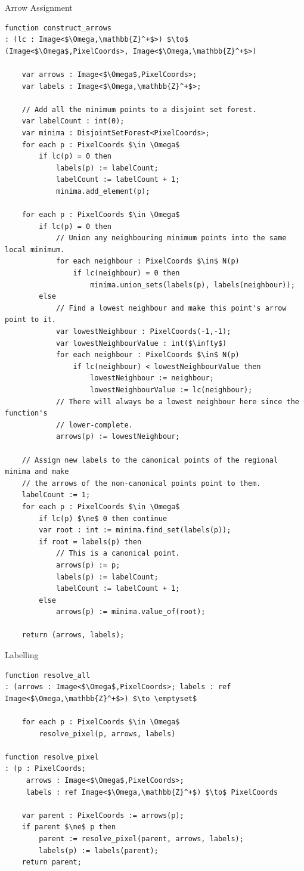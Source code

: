 \begin{stulisting}[p]
\caption{Arrow Assignment}
\label{code:segmentation-watershed-arrowassignment}
\begin{lstlisting}[style=Default]
function construct_arrows
: (lc : Image<$\Omega,\mathbb{Z}^+$>) $\to$ (Image<$\Omega$,PixelCoords>, Image<$\Omega,\mathbb{Z}^+$>)

	var arrows : Image<$\Omega$,PixelCoords>;
	var labels : Image<$\Omega,\mathbb{Z}^+$>;

	// Add all the minimum points to a disjoint set forest.
	var labelCount : int(0);
	var minima : DisjointSetForest<PixelCoords>;
	for each p : PixelCoords $\in \Omega$
		if lc(p) = 0 then
			labels(p) := labelCount;
			labelCount := labelCount + 1;
			minima.add_element(p);

	for each p : PixelCoords $\in \Omega$
		if lc(p) = 0 then
			// Union any neighbouring minimum points into the same local minimum.
			for each neighbour : PixelCoords $\in$ N(p)
				if lc(neighbour) = 0 then
					minima.union_sets(labels(p), labels(neighbour));
		else
			// Find a lowest neighbour and make this point's arrow point to it.
			var lowestNeighbour : PixelCoords(-1,-1);
			var lowestNeighbourValue : int($\infty$)
			for each neighbour : PixelCoords $\in$ N(p)
				if lc(neighbour) < lowestNeighbourValue then
					lowestNeighbour := neighbour;
					lowestNeighbourValue := lc(neighbour);
			// There will always be a lowest neighbour here since the function's
			// lower-complete.
			arrows(p) := lowestNeighbour;

	// Assign new labels to the canonical points of the regional minima and make
	// the arrows of the non-canonical points point to them.
	labelCount := 1;
	for each p : PixelCoords $\in \Omega$
		if lc(p) $\ne$ 0 then continue
		var root : int := minima.find_set(labels(p));
		if root = labels(p) then
			// This is a canonical point.
			arrows(p) := p;
			labels(p) := labelCount;
			labelCount := labelCount + 1;
		else
			arrows(p) := minima.value_of(root);

	return (arrows, labels);
\end{lstlisting}
\end{stulisting}

\begin{stulisting}[p]
\caption{Labelling}
\label{code:segmentation-watershed-labelling}
\begin{lstlisting}[style=Default]
function resolve_all
: (arrows : Image<$\Omega$,PixelCoords>; labels : ref Image<$\Omega,\mathbb{Z}^+$>) $\to \emptyset$

	for each p : PixelCoords $\in \Omega$
		resolve_pixel(p, arrows, labels)

function resolve_pixel
: (p : PixelCoords;
	 arrows : Image<$\Omega$,PixelCoords>;
	 labels : ref Image<$\Omega,\mathbb{Z}^+$) $\to$ PixelCoords

	var parent : PixelCoords := arrows(p);
	if parent $\ne$ p then
		parent := resolve_pixel(parent, arrows, labels);
		labels(p) := labels(parent);
	return parent;
\end{lstlisting}
\end{stulisting}

